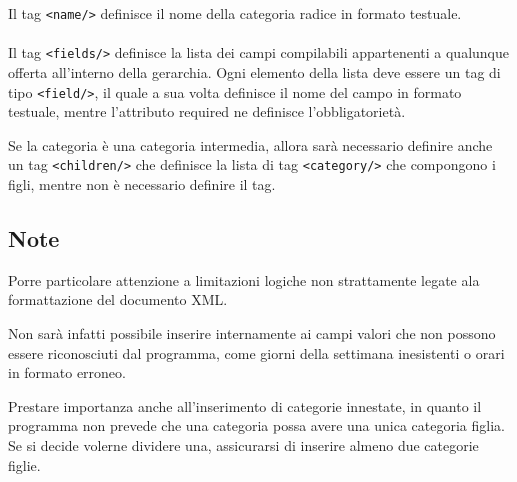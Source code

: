 Il tag \verb|<name/>| definisce il nome della categoria radice in formato testuale.
\\\\
Il tag \verb|<fields/>| definisce la lista dei campi compilabili appartenenti a qualunque offerta all'interno della gerarchia.
Ogni elemento della lista deve essere un tag di tipo \verb|<field/>|, il quale a sua volta definisce il nome del campo in formato testuale, mentre l'attributo required ne definisce l'obbligatorietà.

Se la categoria è una categoria intermedia, allora sarà necessario definire anche un tag \verb|<children/>| che definisce la lista di tag \verb|<category/>| che compongono i figli, mentre non è necessario definire il tag.

\subsection{Note}

Porre particolare attenzione a limitazioni logiche non strattamente legate ala formattazione del documento XML.

Non sarà infatti possibile inserire internamente ai campi valori che non possono essere riconosciuti dal programma, come giorni della settimana inesistenti o orari in formato erroneo.

Prestare importanza anche all'inserimento di categorie innestate, in quanto il programma non prevede che una categoria possa avere una unica categoria figlia. Se si decide volerne dividere una, assicurarsi di inserire almeno due categorie figlie.